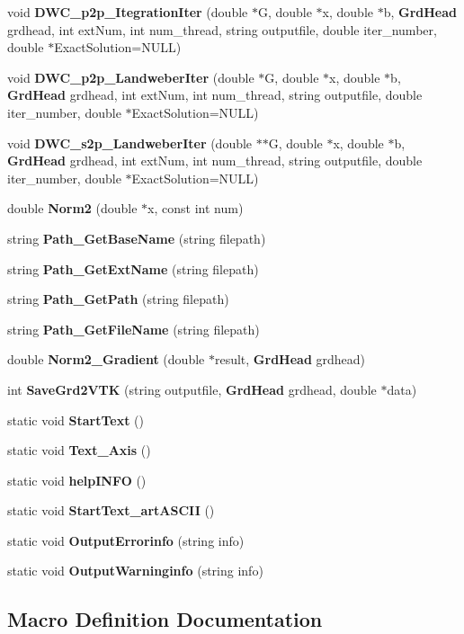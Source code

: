 \begin{DoxyCompactItemize}
\item 
void \textbf{ D\+W\+C\+\_\+p2p\+\_\+\+Itegration\+Iter} (double $\ast$G, double $\ast$x, double $\ast$b, \textbf{ Grd\+Head} grdhead, int ext\+Num, int num\+\_\+thread, string outputfile, double iter\+\_\+number, double $\ast$Exact\+Solution=N\+U\+LL)
\item 
void \textbf{ D\+W\+C\+\_\+p2p\+\_\+\+Landweber\+Iter} (double $\ast$G, double $\ast$x, double $\ast$b, \textbf{ Grd\+Head} grdhead, int ext\+Num, int num\+\_\+thread, string outputfile, double iter\+\_\+number, double $\ast$Exact\+Solution=N\+U\+LL)
\item 
void \textbf{ D\+W\+C\+\_\+s2p\+\_\+\+Landweber\+Iter} (double $\ast$$\ast$G, double $\ast$x, double $\ast$b, \textbf{ Grd\+Head} grdhead, int ext\+Num, int num\+\_\+thread, string outputfile, double iter\+\_\+number, double $\ast$Exact\+Solution=N\+U\+LL)
\item 
double \textbf{ Norm2} (double $\ast$x, const int num)
\item 
string \textbf{ Path\+\_\+\+Get\+Base\+Name} (string filepath)
\item 
string \textbf{ Path\+\_\+\+Get\+Ext\+Name} (string filepath)
\item 
string \textbf{ Path\+\_\+\+Get\+Path} (string filepath)
\item 
string \textbf{ Path\+\_\+\+Get\+File\+Name} (string filepath)
\item 
double \textbf{ Norm2\+\_\+\+Gradient} (double $\ast$result, \textbf{ Grd\+Head} grdhead)
\item 
int \textbf{ Save\+Grd2\+V\+TK} (string outputfile, \textbf{ Grd\+Head} grdhead, double $\ast$data)
\item 
static void \textbf{ Start\+Text} ()
\item 
static void \textbf{ Text\+\_\+\+Axis} ()
\item 
static void \textbf{ help\+I\+N\+FO} ()
\item 
static void \textbf{ Start\+Text\+\_\+art\+A\+S\+C\+II} ()
\item 
static void \textbf{ Output\+Errorinfo} (string info)
\item 
static void \textbf{ Output\+Warninginfo} (string info)
\end{DoxyCompactItemize}


\subsection{Macro Definition Documentation}
\mbox{\label{Conti2D_8h_a79d10e672abb49ad63eeaa8aaef57c38_a79d10e672abb49ad63eeaa8aaef57c38}} 
